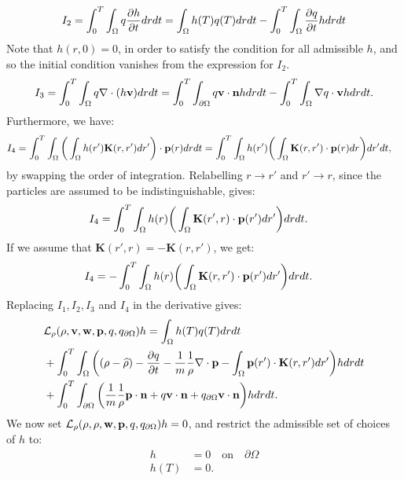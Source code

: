 \begin{align*}
I_2 = \int_0^T \int_\Omega q\frac{\partial h}{\partial t} dr dt = \int_\Omega h(T) q(T) dr dt - \int_0^T \int_\Omega  \frac{\partial q}{\partial t}h dr dt
\end{align*}
Note that ${h}(r,0)=0$, in order to satisfy the condition for all admissible ${h}$, and so the initial condition vanishes from the expression for $I_2$.
\begin{align*}
I_3= \int_0^T \int_\Omega q\nabla \cdot (h \mathbf{v}) dr dt = \int_0^T \int_{\partial \Omega} q \mathbf{v} \cdot \mathbf{n} h dr dt - \int_0^T \int_\Omega \nabla q \cdot \mathbf{v} h dr dt.
\end{align*}
Furthermore, we have:
\begin{align*}
I_{4}&= \int_0^T \int_\Omega \bigg(\int_\Omega  h(r') \mathbf{K}(r,r')dr'\bigg) \cdot \mathbf{p}(r) drdt=\int_0^T \int_\Omega  h(r')\bigg(\int_\Omega  \mathbf{K}(r,r')\cdot \mathbf{p}(r) dr \bigg)dr'dt,
\end{align*}
by swapping the order of integration. 
Relabelling $r \to r'$ and $r' \to r$, since the particles are assumed to be indistinguishable, gives:
\begin{align*}
I_{4}&= \int_0^T \int_\Omega  h(r)\bigg(\int_\Omega  \mathbf{K}(r',r) \cdot \mathbf{p}(r') dr' \bigg)drdt.
\end{align*}
If we assume that $\mathbf{K}(r',r) = - \mathbf{K}(r,r')$, we get:
\begin{align*}
I_{4}&= -\int_0^T \int_\Omega  h(r)\bigg(\int_\Omega  \mathbf{K}(r,r') \cdot \mathbf{p}(r') dr' \bigg)drdt.
\end{align*}
Replacing $I_1, I_2, I_3$ and $I_4$ in the derivative gives:
\begin{align*}
&\mathcal{L}_\rho(\rho,\mathbf{v},\mathbf{w},\mathbf{p},q,{q}_{\partial \Omega})h = \int_\Omega h(T) q(T) dr dt  \\
&+ \int_0^T \int_\Omega \bigg( (\rho - \widehat \rho) - \frac{\partial q}{\partial t} -\frac{1}{m} \frac{1}{\rho}\nabla \cdot \mathbf{p} -  \int_\Omega  \mathbf{p}(r') \cdot\mathbf{K}(r,r')   dr'  \bigg)hdr dt\\
&+\int_0^T \int_{\partial \Omega} \bigg( \frac{1}{m} \frac{1}{\rho} \mathbf{p} \cdot \mathbf{n} + q \mathbf{v} \cdot \mathbf{n}   +{q}_{\partial \Omega} \mathbf{v} \cdot \mathbf{n}\bigg)h  dr dt.
\end{align*}
We now set $\mathcal{L}_\rho(\rho,\rho,\mathbf{w},\mathbf{p},q,{q}_{\partial \Omega})h=0$, and restrict the admissible set of choices of $h$ to:
\begin{align*}
h&=0 \quad \text{on} \quad \partial \Omega\\
h(T)&=0.
\end{align*}
